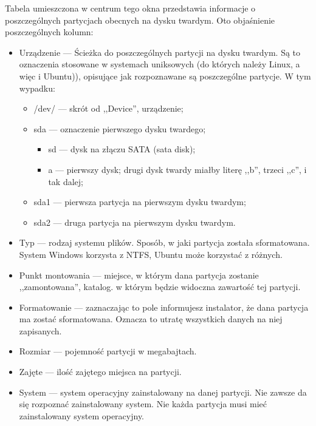 Tabela umieszczona w centrum tego okna przedstawia informacje o poszczególnych partycjach obecnych na dysku twardym. Oto objaśnienie poszczególnych kolumn:
\begin{itemize}
\item \textcolor{ubuntu_orange}{Urządzenie} --- Ścieżka do poszczególnych partycji na dysku twardym. Są to oznaczenia stosowane w systemach uniksowych (do których należy Linux, a więc i Ubuntu)), opisujące jak rozpoznawane są poszczególne partycje. W tym wypadku:
        \begin{itemize}
        \item \textcolor{ubuntu_orange}{/dev/} --- skrót od ,,Device'', urządzenie;
        \item \textcolor{ubuntu_orange}{sda} --- oznaczenie pierwszego dysku twardego;
                \begin{itemize}
                        \item \textcolor{ubuntu_orange}{sd} --- dysk na złączu SATA (sata disk);
                        \item \textcolor{ubuntu_orange}{a} --- pierwszy dysk; drugi dysk twardy miałby literę ,,b'', trzeci ,,c'', i tak dalej;
                \end{itemize}
        \item \textcolor{ubuntu_orange}{sda1} --- pierwsza partycja na pierwszym dysku twardym;
        \item \textcolor{ubuntu_orange}{sda2} --- druga partycja na pierwszym dysku twardym.
        \end{itemize}
\item \textcolor{ubuntu_orange}{Typ} --- rodzaj systemu plików. Sposób, w jaki partycja została sformatowana. System Windows korzysta z NTFS, Ubuntu może korzystać z różnych.
\item \textcolor{ubuntu_orange}{Punkt montowania} --- miejsce, w którym dana partycja zostanie ,,zamontowana'', katalog. w którym będzie widoczna zawartość tej partycji.
\item \textcolor{ubuntu_orange}{Formatowanie} --- zaznaczając to pole informujesz instalator, że dana partycja ma zostać sformatowana. Oznacza to utratę wszystkich danych na niej zapisanych.
\item \textcolor{ubuntu_orange}{Rozmiar} --- pojemność partycji w megabajtach.
\item \textcolor{ubuntu_orange}{Zajęte} --- ilość zajętego miejsca na partycji.
\item \textcolor{ubuntu_orange}{System} --- system operacyjny zainstalowany na danej partycji. Nie zawsze da się rozpoznać zainstalowany system. Nie każda partycja musi mieć zainstalowany system operacyjny. 
\end{itemize}
\clearpage
